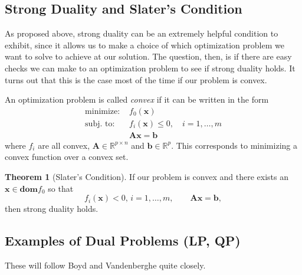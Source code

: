 \documentclass[10pt,letterpaper]{article}
\theoremstyle{definition}
\newtheorem{theorem}{Theorem}[section]
\theoremstyle{remark}
\newcommand\R{\mathbb{R}}
\newcommand\A{\boldsymbol{A}}
\newcommand\x{\boldsymbol{x}}
\renewcommand\b{\boldsymbol{b}}
\begin{document}
\subsection{Strong Duality and Slater's Condition}

As proposed above, strong duality can be an extremely helpful condition to exhibit, since it allows us to make
a choice of which optimization problem we want to solve to achieve at our solution. The question, then,
is if there are easy checks we can make to an optimization problem to see if strong duality holds. It turns
out that this is the case most of the time if our problem is convex.

An optimization problem is called \emph{convex} if it can be written in the form
\begin{align*}
    \text{minimize: } & f_0(\x)\\
    \text{subj. to: } & f_i(\x) \leq 0,\quad i=1,\ldots,m\\
                      & \A\x = \b
\end{align*}
where $f_i$ are all convex, $\A\in\R^{p\times n}$ and $\b\in\R^p$. This corresponds to
minimizing a convex function over a convex set.

\begin{theorem}[Slater's Condition]
    If our problem is convex and there exists an $\x\in \mathbf{dom} f_0$ so that
    \[
        f_i(\x) < 0,\,i=1,\ldots,m,\qquad\A\x=\b,
    \]
    then strong duality holds.
\end{theorem}

\subsection{Examples of Dual Problems (LP, QP)}

These will follow Boyd and Vandenberghe quite closely.
\end{document}
